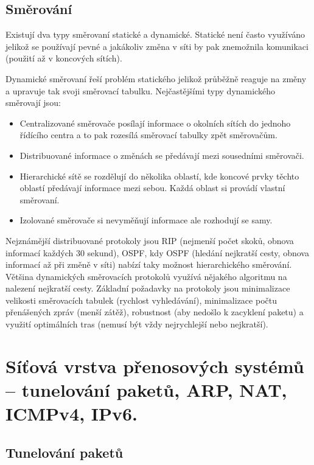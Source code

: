 \subsection{Směrování}

Existují dva typy směrovaní statické a dynamické. Statické není často využíváno jelikož se používají pevné a jakákoliv změna v síti by pak znemožnila komunikaci (použití až v koncových sítích). 

Dynamické směrovaní řeší problém statického jelikož průběžně reaguje na změny a upravuje tak svoji směrovací tabulku. Nejčastějšími typy dynamického směrovají jsou:

\begin{itemize}[noitemsep]
    \item Centralizované směrovače posílají informace o okolních sítích do jednoho řídícího centra a to pak rozesílá směrovací tabulky zpět směrovačům.
    \item Distribuované informace o změnách se předávají mezi sousedními směrovači. 
    \item Hierarchické sítě se rozdělují do několika oblastí, kde koncové prvky těchto oblastí předávají informace mezi sebou. Každá oblast si provádí vlastní směrovaní.
    \item Izolované směrovače si nevyměňují informace ale rozhodují se samy.
\end{itemize}

Nejznámější distribuované protokoly jsou RIP (nejmenší počet skoků, obnova informací každých 30 sekund), OSPF, kdy OSPF (hledání nejkratší cesty, obnova informací až při změně v síti) nabízí taky možnost hierarchického směrování. Většina dynamických směrovacích protokolů využívá nějakého algoritmu na nalezení nejkratší cesty. Základní požadavky na protokoly jsou minimalizace velikosti směrovacích tabulek (rychlost vyhledávání), minimalizace počtu přenášených zpráv (menší zátěž), robustnost (aby nedošlo k zacyklení paketu) a využití optimálních tras (nemusí být vždy nejrychlejší nebo nejkratší).

\clearpage
\section{Síťová vrstva přenosových systémů -- tunelování paketů, ARP, NAT, ICMPv4, IPv6.}

\subsection{Tunelování paketů}

